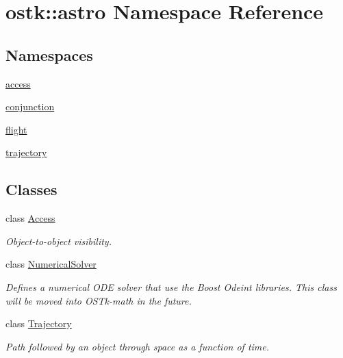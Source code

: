 \hypertarget{namespaceostk_1_1astro}{}\section{ostk\+:\+:astro Namespace Reference}
\label{namespaceostk_1_1astro}
\subsection*{Namespaces}
\begin{DoxyCompactItemize}
\item 
 \hyperlink{namespaceostk_1_1astro_1_1access}{access}
\item 
 \hyperlink{namespaceostk_1_1astro_1_1conjunction}{conjunction}
\item 
 \hyperlink{namespaceostk_1_1astro_1_1flight}{flight}
\item 
 \hyperlink{namespaceostk_1_1astro_1_1trajectory}{trajectory}
\end{DoxyCompactItemize}
\subsection*{Classes}
\begin{DoxyCompactItemize}
\item 
class \hyperlink{classostk_1_1astro_1_1_access}{Access}
\begin{DoxyCompactList}\small\item\em Object-\/to-\/object visibility. \end{DoxyCompactList}\item 
class \hyperlink{classostk_1_1astro_1_1_numerical_solver}{Numerical\+Solver}
\begin{DoxyCompactList}\small\item\em Defines a numerical O\+DE solver that use the Boost Odeint libraries. This class will be moved into O\+S\+Tk-\/math in the future. \end{DoxyCompactList}\item 
class \hyperlink{classostk_1_1astro_1_1_trajectory}{Trajectory}
\begin{DoxyCompactList}\small\item\em Path followed by an object through space as a function of time. \end{DoxyCompactList}\end{DoxyCompactItemize}
